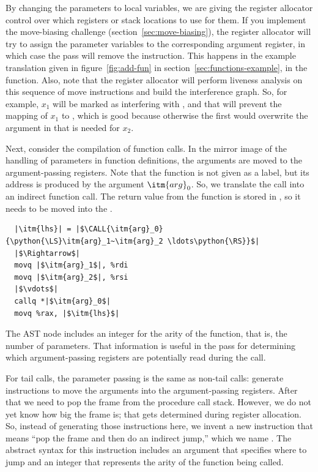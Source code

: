 \documentclass[7x10]{TimesAPriori_MIT}%
\def\pythonEd{1}
\providecommand{\BookEdition}{1}
\let\edition\BookEdition
\newcommand{\pythonColor}[0]{}
\newcommand{\python}[1]{{\if\edition\pythonEd\pythonColor #1\fi}}
\numberwithin{theorem}{chapter}
\numberwithin{definition}{chapter}
\numberwithin{equation}{chapter}
\begin{document}
By changing the parameters to local variables, we are giving the
register allocator control over which registers or stack locations to
use for them. If you implement the move-biasing challenge
(section~\ref{sec:move-biasing}), the register allocator will try to
assign the parameter variables to the corresponding argument register,
in which case the  pass will remove the
 instruction. This happens in the example translation given
in figure~\ref{fig:add-fun} in section~\ref{sec:functions-example}, in
the  function.
%
Also, note that the register allocator will perform liveness analysis
on this sequence of move instructions and build the interference
graph. So, for example, $x_1$ will be marked as interfering with
, and that will prevent the mapping of $x_1$ to ,
which is good because otherwise the first  would overwrite
the argument in  that is needed for $x_2$.

Next, consider the compilation of function calls. In the mirror image
of the handling of parameters in function definitions, the arguments
are moved to the argument-passing registers.  Note that the function
is not given as a label, but its address is produced by the argument
$\itm{arg}_0$. So, we translate the call into an indirect function
call. The return value from the function is stored in , so
it needs to be moved into the .
\begin{lstlisting}
  |\itm{lhs}| = |$\CALL{\itm{arg}_0}{\python{\LS}\itm{arg}_1~\itm{arg}_2 \ldots\python{\RS}}$|
  |$\Rightarrow$|
  movq |$\itm{arg}_1$|, %rdi
  movq |$\itm{arg}_2$|, %rsi
  |$\vdots$|
  callq *|$\itm{arg}_0$|
  movq %rax, |$\itm{lhs}$|
\end{lstlisting}
The  AST node includes an integer for the arity of
the function, that is, the number of parameters. That information is
useful in the  pass for determining which
argument-passing registers are potentially read during the call.

For tail calls, the parameter passing is the same as non-tail calls:
generate instructions to move the arguments into the argument-passing
registers.  After that we need to pop the frame from the procedure
call stack.  However, we do not yet know how big the frame is; that
gets determined during register allocation. So, instead of generating
those instructions here, we invent a new instruction that means ``pop
the frame and then do an indirect jump,'' which we name
. The abstract syntax for this instruction includes an
argument that specifies where to jump and an integer that represents
the arity of the function being called.
\end{document}
